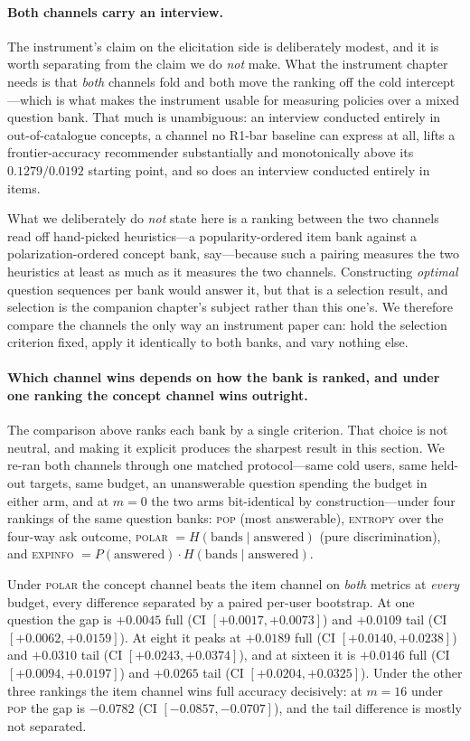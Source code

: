 \documentclass[11pt]{article}
\begin{document}
\paragraph{Both channels carry an interview.} The instrument's claim on the elicitation side is deliberately modest,
and it is worth separating from the claim we do \emph{not} make. What the instrument chapter needs is that \emph{both}
channels fold and both move the ranking off the cold intercept---which is what makes the instrument usable for
measuring policies over a mixed question bank. That much is unambiguous: an interview conducted entirely in
out-of-catalogue concepts, a channel no R1-bar baseline can express at all, lifts a frontier-accuracy recommender
substantially and monotonically above its $0.1279/0.0192$ starting point, and so does an interview conducted entirely
in items.

What we deliberately do \emph{not} state here is a ranking between the two channels read off hand-picked
heuristics---a popularity-ordered item bank against a polarization-ordered concept bank, say---because such a
pairing measures the two heuristics at least as much as it measures the two channels. Constructing
\emph{optimal} question sequences per bank would answer it, but that is a selection result, and selection is
the companion chapter's subject rather than this one's. We therefore compare the channels the only way an
instrument paper can: hold the selection criterion fixed, apply it identically to both banks, and vary
nothing else.

\paragraph{Which channel wins depends on how the bank is ranked, and under one ranking the concept
channel wins outright.} The comparison above ranks each bank by a single criterion. That choice is not
neutral, and making it explicit produces the sharpest result in this section. We re-ran both channels
through one matched protocol---same cold users, same held-out targets, same budget, an unanswerable
question spending the budget in either arm, and at $m{=}0$ the two arms bit-identical by
construction---under four rankings of the same question banks: \textsc{pop} (most answerable),
\textsc{entropy} over the four-way ask outcome, \textsc{polar} $=H(\text{bands}\mid\text{answered})$
(pure discrimination), and \textsc{expinfo} $=P(\text{answered})\cdot H(\text{bands}\mid\text{answered})$.

Under \textsc{polar} the concept channel beats the item channel on \emph{both} metrics at \emph{every}
budget, every difference separated by a paired per-user bootstrap. At one question the gap is
$+0.0045$ full (CI $[+0.0017,+0.0073]$) and $+0.0109$ tail (CI $[+0.0062,+0.0159]$).
At eight it peaks at $+0.0189$ full (CI $[+0.0140,+0.0238]$) and $+0.0310$ tail
(CI $[+0.0243,+0.0374]$), and at sixteen it is $+0.0146$ full (CI $[+0.0094,+0.0197]$)
and $+0.0265$ tail (CI $[+0.0204,+0.0325]$). Under the other three rankings the
item channel wins full accuracy decisively: at $m{=}16$ under \textsc{pop} the gap is $-0.0782$
(CI $[-0.0857,-0.0707]$), and the tail difference is mostly not separated.
\end{document}
